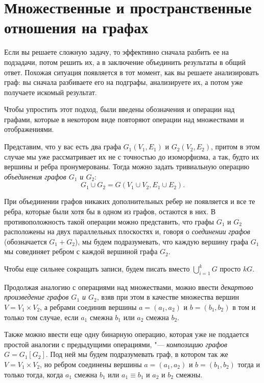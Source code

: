 \section{Множественные и пространственные отношения на графах}


	Если вы решаете сложную задачу, то эффективно сначала разбить ее на подзадачи, потом решить их, а в заключение объединить результаты в общий ответ. Похожая ситуация появляется в тот момент, как вы решаете анализировать граф: вы сначала разбиваете его на подграфы, анализируете их, а потом уже получаете искомый результат. 
	
	Чтобы упростить этот подход, были введены обозначения и операции над графами, которые в некотором виде повторяют операции над множествами и отображениями.
	
	Представим, что у вас есть два графа $G_1(V_1, E_1)$ и $G_2(V_2, E_2)$, притом в этом случае мы уже рассматривает их не с точностью до изоморфизма, а так, будто их вершины и ребра пронумерованы. Тогда можно задать тривиальную операцию \emph{объединения графов $G_1$ и $G_2$}:
	$$G_1 \cup G_2 = G(V_1 \cup V_2, E_1 \cup E_2).$$
	
	При объединении графов никаких дополнительных ребер не появляется и все те ребра, которые были хотя бы в одном из графов, остаются в них. В противоположность такой операции можно представить, что графы $G_1$ и $G_2$ расположены на двух параллельных плоскостях и, говоря о \emph{соединении графов} (обозначается $G_1 + G_2$), мы будем подразумевать, что каждую вершину графа $G_1$ мы совединяет ребром с каждой вершиной графа $G_2$.
	
	Чтобы еще сильнее сокращать записи, будем писать вместо $\bigcup\limits_{i=1}^{k} G$ просто $kG$.
	
	Продолжая аналогию с операциями над множествами, можно ввести \emph{декартово произведение графов $G_1$ и $G_2$}, взяв при этом в качестве множества вершин $V = V_1 \times V_2$, а ребрами соединив вершины $a = (a_1, a_2)$ и $b = (b_1, b_2)$ в том и только том случае, если $a_1$ смежна $b_1$ или $a_2$ смежна $b_2$.
	
	Также можно ввести еще одну бинарную операцию, которая уже не поддается простой аналогии с предыдущими операциями, "--- \emph{композицию графов $G = G_1[G_2]$}. Под ней мы будем подразумевать граф, в котором так же $V = V_1 \times V_2$, но ребром соединены вершины $a = (a_1, a_2)$ и $b = (b_1, b_2)$ тогда и только тогда, когда $a_1$ смежна $b_1$ или $a_1 \equiv b_1$ и $a_2$ и $b_2$ смежны.  
	
